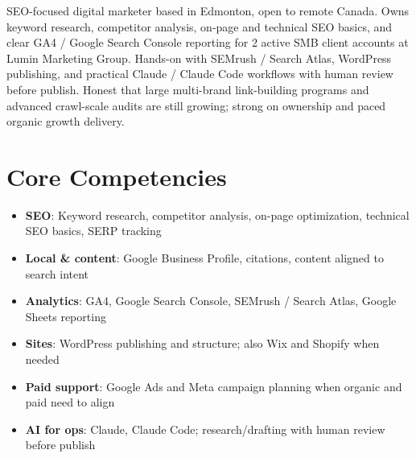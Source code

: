 \documentclass[11pt,a4paper,sans]{moderncv}
\begin{document}
\makecvtitle

\vspace{6pt}
\small{SEO-focused digital marketer based in Edmonton, open to remote Canada. Owns keyword research, competitor analysis, on-page and technical SEO basics, and clear GA4 / Google Search Console reporting for 2 active SMB client accounts at Lumin Marketing Group. Hands-on with SEMrush / Search Atlas, WordPress publishing, and practical Claude / Claude Code workflows with human review before publish. Honest that large multi-brand link-building programs and advanced crawl-scale audits are still growing; strong on ownership and paced organic growth delivery.}

\section{Core Competencies}
\vspace{1pt}
\begin{itemize}
\item \textbf{SEO}: Keyword research, competitor analysis, on-page optimization, technical SEO basics, SERP tracking
\item \textbf{Local \& content}: Google Business Profile, citations, content aligned to search intent
\item \textbf{Analytics}: GA4, Google Search Console, SEMrush / Search Atlas, Google Sheets reporting
\item \textbf{Sites}: WordPress publishing and structure; also Wix and Shopify when needed
\item \textbf{Paid support}: Google Ads and Meta campaign planning when organic and paid need to align
\item \textbf{AI for ops}: Claude, Claude Code; research/drafting with human review before publish
\end{itemize}
\end{document}
